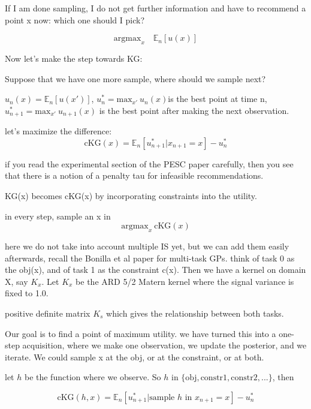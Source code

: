 \documentclass[12pt]{article}
\begin{document}

If I am done sampling, I do not get further information and have to recommend a point x now: which one should I pick?

\begin{equation*}
\text{argmax}_x\quad \mathbb{E}_n[ u(x) ]
\end{equation*}

Now let's make the step towards KG:

Suppose that we have one more sample, where should we sample next?

$u_n(x) =\mathbb{E}_n[u(x')] $, $u_n^* = \text{max}_{x'}\ u_n(x) $is the best point at time n, $u_{n+1}^*=\text{max}_{x'}\ u_{n+1}(x)$ is the best point after making the next observation.

let's maximize the difference:
\begin{equation*}
\text{cKG}(x) =  \mathbb{E}_n[u_{n+1}^*|x_{n+1} = x] - u_n^*
\end{equation*}

if you read the experimental section of the PESC paper carefully, then you see that there is a notion of a penalty tau for infeasible recommendations.

KG(x) becomes cKG(x) by incorporating constraints into the utility.

in every step, sample an x in 
$$\text{argmax}_x\ \text{cKG}(x)$$

here we do not take into account multiple IS yet, but we can add them easily afterwards, recall the Bonilla et al paper for multi-task GPs. think of task 0 as the obj(x), and of task 1 as the constraint c(x). Then we have a kernel on domain X, say $K_x$. Let $K_x$ be the ARD 5/2 Matern kernel where the signal variance is fixed to 1.0.

positive definite matrix $K_s$ which gives the relationship between both tasks.

Our goal is to find a point of maximum utility. we have turned this into a one-step acquisition, where we make one observation, we update the posterior, and we iterate. We could sample x at the obj, or at the constraint, or at both.

let $h$ be the function where we observe.
So $h$ in $\{\text{obj}, \text{constr1}, \text{constr2},...\}$, then

\begin{equation*}
\text{cKG}(h,x) =  \mathbb{E}_n[u_{n+1}^*|\text{sample $h$ in }x_{n+1} = x] - u_n^*
\end{equation*}
\end{document}

